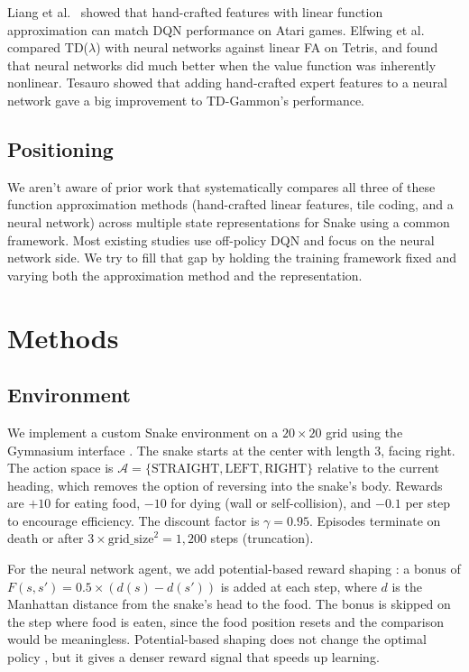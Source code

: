 \documentclass[letterpaper]{article}
\begin{document}
Liang et al.\  showed that hand-crafted features with linear function approximation can match DQN performance on Atari games. Elfwing et al.\  compared TD($\lambda$) with neural networks against linear FA on Tetris, and found that neural networks did much better when the value function was inherently nonlinear. Tesauro  showed that adding hand-crafted expert features to a neural network gave a big improvement to TD-Gammon's performance.

\subsection{Positioning}

We aren't aware of prior work that systematically compares all three of these function approximation methods (hand-crafted linear features, tile coding, and a neural network) across multiple state representations for Snake using a common framework. Most existing studies use off-policy DQN and focus on the neural network side. We try to fill that gap by holding the training framework fixed and varying both the approximation method and the representation.

\section{Methods}

\subsection{Environment}

We implement a custom Snake environment on a $20 \times 20$ grid using the Gymnasium interface \cite{gymnasium}. The snake starts at the center with length 3, facing right. The action space is $\mathcal{A} = \{\text{STRAIGHT}, \text{LEFT}, \text{RIGHT}\}$ relative to the current heading, which removes the option of reversing into the snake's body. Rewards are $+10$ for eating food, $-10$ for dying (wall or self-collision), and $-0.1$ per step to encourage efficiency. The discount factor is $\gamma = 0.95$. Episodes terminate on death or after $3 \times \text{grid\_size}^2 = 1{,}200$ steps (truncation).

For the neural network agent, we add potential-based reward shaping \cite{ng1999reward}: a bonus of $F(s, s') = 0.5 \times (d(s) - d(s'))$ is added at each step, where $d$ is the Manhattan distance from the snake's head to the food. The bonus is skipped on the step where food is eaten, since the food position resets and the comparison would be meaningless. Potential-based shaping does not change the optimal policy \cite{ng1999reward}, but it gives a denser reward signal that speeds up learning.
\end{document}

